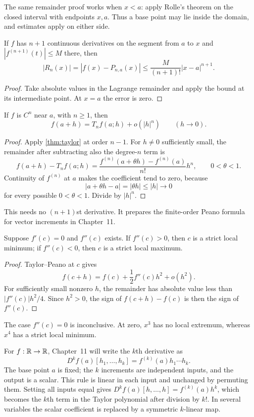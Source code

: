 The same remainder proof works when $x<a$: apply Rolle's theorem on
the closed interval with endpoints $x,a$. Thus a base point may lie
inside the domain, and estimates apply on either side.
\begin{corollary}\label{cor:ordinary-taylor-bound}
If $f$ has $n+1$ continuous derivatives on the segment from $a$ to $x$
and $|f^{(n+1)}(t)|\leq M$ there, then
\[
|R_n(x)|=|f(x)-P_{n,a}(x)|\leq\frac{M}{(n+1)!}|x-a|^{n+1}.
\]
\end{corollary}
\begin{proof}
Take absolute values in the Lagrange remainder and apply the bound at
its intermediate point. At $x=a$ the error is zero.
\end{proof}
\begin{corollary}\label{cor:ordinary-peano}
If $f$ is $C^n$ near $a$, with $n\geq1$, then
\[
f(a+h)=T_nf(a;h)+o(|h|^n)\qquad(h\to0).
\]
\end{corollary}
\begin{proof}
Apply \cref{thm:taylor} at order $n-1$. For $h\ne0$ sufficiently small,
the remainder after subtracting also the degree-$n$ term is
\[
f(a+h)-T_nf(a;h)
=\frac{f^{(n)}(a+\theta h)-f^{(n)}(a)}{n!}h^n,
\qquad 0<\theta<1.
\]
Continuity of $f^{(n)}$ at $a$ makes the coefficient tend to zero, because
\[
|a+\theta h-a|=|\theta h|\leq|h|\longrightarrow0
\]
for every possible $0<\theta<1$. Divide by $|h|^n$.
\end{proof}
This needs no $(n+1)$st derivative. It prepares the finite-order Peano
formula for vector increments in Chapter~11.

\begin{theorem}
\label{thm:second-derivative-test}
Suppose \(f'(c)=0\) and \(f''(c)\) exists. If \(f''(c)>0\), then \(c\) is
a strict local minimum; if \(f''(c)<0\), then \(c\) is a strict local
maximum.
\end{theorem}
\begin{proof}
Taylor--Peano at \(c\) gives
\[
f(c+h)=f(c)+\frac12f''(c)h^2+o(h^2).
\]
For sufficiently small nonzero \(h\), the remainder has absolute value
less than \(|f''(c)|h^2/4\). Since \(h^2>0\), the sign of
\(f(c+h)-f(c)\) is then the sign of \(f''(c)\).
\end{proof}
The case \(f''(c)=0\) is inconclusive. At zero, \(x^3\) has no local
extremum, whereas \(x^4\) has a strict local minimum.

\begin{remark}
For $f:\mathbb{R}\to\mathbb{R}$, Chapter~11 will write the $k$th derivative as
\[
D^kf(a)[h_1,\ldots,h_k]=f^{(k)}(a)h_1\cdots h_k.
\]
The base point $a$ is fixed; the $k$ increments are independent inputs,
and the output is a scalar. This rule is linear in each input and
unchanged by permuting them. Setting all inputs equal gives
$D^kf(a)[h,\ldots,h]=f^{(k)}(a)h^k$, which becomes the $k$th term in the Taylor
polynomial after division by $k!$. In several variables the scalar coefficient is replaced by
a symmetric $k$-linear map.
\end{remark}

